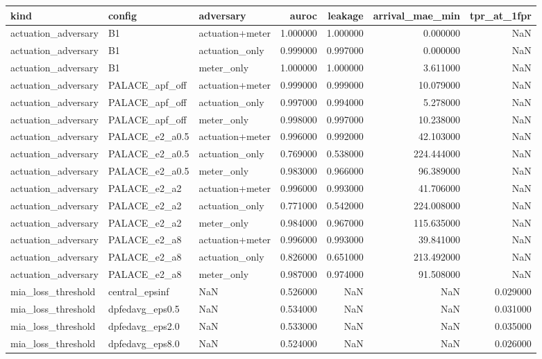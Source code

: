 \begin{tabular}{lllrrrr}
\toprule
kind & config & adversary & auroc & leakage & arrival_mae_min & tpr_at_1fpr \\
\midrule
actuation_adversary & B1 & actuation+meter & 1.000000 & 1.000000 & 0.000000 & NaN \\
actuation_adversary & B1 & actuation_only & 0.999000 & 0.997000 & 0.000000 & NaN \\
actuation_adversary & B1 & meter_only & 1.000000 & 1.000000 & 3.611000 & NaN \\
actuation_adversary & PALACE_apf_off & actuation+meter & 0.999000 & 0.999000 & 10.079000 & NaN \\
actuation_adversary & PALACE_apf_off & actuation_only & 0.997000 & 0.994000 & 5.278000 & NaN \\
actuation_adversary & PALACE_apf_off & meter_only & 0.998000 & 0.997000 & 10.238000 & NaN \\
actuation_adversary & PALACE_e2_a0.5 & actuation+meter & 0.996000 & 0.992000 & 42.103000 & NaN \\
actuation_adversary & PALACE_e2_a0.5 & actuation_only & 0.769000 & 0.538000 & 224.444000 & NaN \\
actuation_adversary & PALACE_e2_a0.5 & meter_only & 0.983000 & 0.966000 & 96.389000 & NaN \\
actuation_adversary & PALACE_e2_a2 & actuation+meter & 0.996000 & 0.993000 & 41.706000 & NaN \\
actuation_adversary & PALACE_e2_a2 & actuation_only & 0.771000 & 0.542000 & 224.008000 & NaN \\
actuation_adversary & PALACE_e2_a2 & meter_only & 0.984000 & 0.967000 & 115.635000 & NaN \\
actuation_adversary & PALACE_e2_a8 & actuation+meter & 0.996000 & 0.993000 & 39.841000 & NaN \\
actuation_adversary & PALACE_e2_a8 & actuation_only & 0.826000 & 0.651000 & 213.492000 & NaN \\
actuation_adversary & PALACE_e2_a8 & meter_only & 0.987000 & 0.974000 & 91.508000 & NaN \\
mia_loss_threshold & central_epsinf & NaN & 0.526000 & NaN & NaN & 0.029000 \\
mia_loss_threshold & dpfedavg_eps0.5 & NaN & 0.534000 & NaN & NaN & 0.031000 \\
mia_loss_threshold & dpfedavg_eps2.0 & NaN & 0.533000 & NaN & NaN & 0.035000 \\
mia_loss_threshold & dpfedavg_eps8.0 & NaN & 0.524000 & NaN & NaN & 0.026000 \\

\end{tabular}
